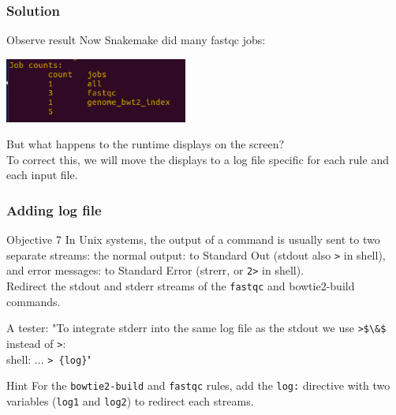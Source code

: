 \begin{frame}[containsverbatim]
\frametitle{Solution}

\begin{exampleblock}{Observe result}
Now Snakemake did many fastqc jobs:
\begin{center}
    \includegraphics[width=6cm]{03_workflow/images/FAIR_ex1_o6_smk.png}
\end{center}
But what happens to the runtime displays on the screen?\\

To correct this, we will move the displays to a log file specific for each rule and each input file.
\end{exampleblock}
\end{frame}
\begin{frame}[containsverbatim]
\frametitle{Adding log file}
\begin{exampleblock}{Objective 7}
In Unix systems, the output of a command is usually sent to two separate streams: the normal output: to Standard Out (stdout also \verb|>| in shell), and error messages: to Standard Error (strerr, or \verb|2>| in shell). \\
Redirect the stdout and stderr streams of the \verb|fastqc| and bowtie2-build commands. \\
\end{exampleblock}
\alert{A tester:} "To integrate stderr into the same log file as the stdout we use \verb|>$\&$| instead of \verb|>|: \\ shell: ...  \verb|> {log}|"
\begin{exampleblock}{Hint}
For the \verb|bowtie2-build| and \verb|fastqc| rules, add the \verb|log:| directive with two variables (\verb|log1| and \verb|log2|) to redirect each streams.
\end{exampleblock}
\end{frame}
